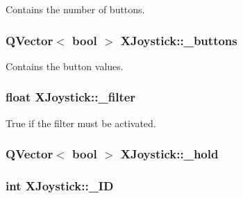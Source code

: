 Contains the number of buttons. 

\hypertarget{class_x_joystick_a2067117adaa8161d974e6c2bb9776ec3}{}
\subsubsection[{\+\_\+buttons}]{\setlength{\rightskip}{0pt plus 5cm}Q\+Vector$<$ bool $>$ X\+Joystick\+::\+\_\+buttons\hspace{0.3cm}{\ttfamily [private]}}\label{class_x_joystick_a2067117adaa8161d974e6c2bb9776ec3}


Contains the button values. 

\hypertarget{class_x_joystick_ab209883db3b333014323cba17123bb9b}{}
\subsubsection[{\+\_\+filter}]{\setlength{\rightskip}{0pt plus 5cm}float X\+Joystick\+::\+\_\+filter\hspace{0.3cm}{\ttfamily [private]}}\label{class_x_joystick_ab209883db3b333014323cba17123bb9b}


True if the filter must be activated. 

\hypertarget{class_x_joystick_a2cece971d24e1970176a2271b7f14a2d}{}
\subsubsection[{\+\_\+hold}]{\setlength{\rightskip}{0pt plus 5cm}Q\+Vector$<$ bool $>$ X\+Joystick\+::\+\_\+hold\hspace{0.3cm}{\ttfamily [private]}}\label{class_x_joystick_a2cece971d24e1970176a2271b7f14a2d}
\hypertarget{class_x_joystick_a9916e0cad47852ca6fedcac461c3457b}{}
\subsubsection[{\+\_\+\+I\+D}]{\setlength{\rightskip}{0pt plus 5cm}int X\+Joystick\+::\+\_\+\+I\+D\hspace{0.3cm}{\ttfamily [private]}}\label{class_x_joystick_a9916e0cad47852ca6fedcac461c3457b}


